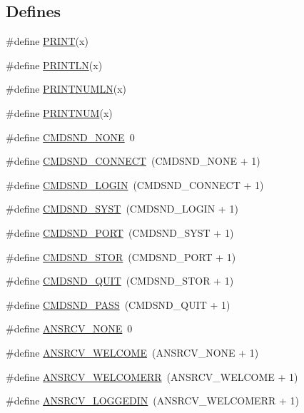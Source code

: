 \subsection*{Defines}
\begin{DoxyCompactItemize}
\item 
\#define \hyperlink{group__ftp_gad61844ab25ea35139950e67e9693bc9f}{PRINT}(x)
\item 
\#define \hyperlink{group__ftp_gaf1066d64ca1f5b865b189616551600dc}{PRINTLN}(x)
\item 
\#define \hyperlink{group__ftp_ga5c366d912fefc695bb2501c32c06d960}{PRINTNUMLN}(x)
\item 
\#define \hyperlink{group__ftp_gaa473ff561ce5a8a6b190ed0af2ac8b95}{PRINTNUM}(x)
\item 
\#define \hyperlink{group__ftp_ga9e14673f34cb499027401340dea9b9e2}{CMDSND\_\-NONE}~0
\item 
\#define \hyperlink{group__ftp_gaf25fc10c49d68867d1e496bccc9f0cd9}{CMDSND\_\-CONNECT}~(CMDSND\_\-NONE + 1)
\item 
\#define \hyperlink{group__ftp_gab8d23bf318a17f220349744e7f6b1f2d}{CMDSND\_\-LOGIN}~(CMDSND\_\-CONNECT + 1)
\item 
\#define \hyperlink{group__ftp_gac9eca61747dcd7285f647e74c01bdf74}{CMDSND\_\-SYST}~(CMDSND\_\-LOGIN + 1)
\item 
\#define \hyperlink{group__ftp_ga5fd7323ffea47577521123adcc300ad6}{CMDSND\_\-PORT}~(CMDSND\_\-SYST + 1)
\item 
\#define \hyperlink{group__ftp_gaf3f7c0df09046aa2d6c810d3e17344e8}{CMDSND\_\-STOR}~(CMDSND\_\-PORT + 1)
\item 
\#define \hyperlink{group__ftp_ga331a32428d69dbedae488b9628ca4d8f}{CMDSND\_\-QUIT}~(CMDSND\_\-STOR + 1)
\item 
\#define \hyperlink{group__ftp_gad963fe7e365e51c13a39021a072514dc}{CMDSND\_\-PASS}~(CMDSND\_\-QUIT + 1)
\item 
\#define \hyperlink{group__ftp_ga20c7bbe8c9836e383a612d6d5b8be490}{ANSRCV\_\-NONE}~0
\item 
\#define \hyperlink{group__ftp_ga18ecbf05891a39d2a3f8890a338c8ec6}{ANSRCV\_\-WELCOME}~(ANSRCV\_\-NONE + 1)
\item 
\#define \hyperlink{group__ftp_ga6fd95b3152bece39bd3f3183db675bfb}{ANSRCV\_\-WELCOMERR}~(ANSRCV\_\-WELCOME + 1)
\item 
\#define \hyperlink{group__ftp_ga789dffa9cb46046e7ad4a58fa6b56938}{ANSRCV\_\-LOGGEDIN}~(ANSRCV\_\-WELCOMERR + 1)
\item 

\end{DoxyCompactItemize}
